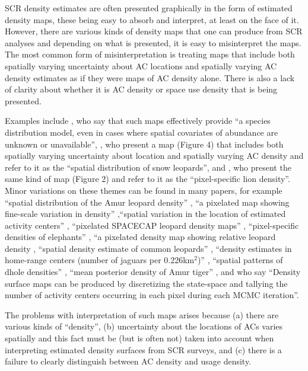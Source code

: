 \documentclass[useAMS,usenatbib,referee]{biom}
\begin{document}
SCR density estimates are often presented graphically in the form of estimated density maps, these being easy to absorb and interpret, at least on the face of it.  However, there are various kinds of density maps that one can produce from SCR analyses and depending on what is presented, it is easy to misinterpret the maps. The most common form of misinterpretation is treating maps that include both spatially varying uncertainty about AC locations and spatially varying AC density estimates as if they were maps of AC density alone. There is also a lack of clarity about whether it is AC density or space use density that is being presented.

Examples include \cite{Dorazio+Karanth:17}, who say that such maps effectively provide  ``a species distribution model, even in cases where spatial covariates of abundance are unknown or unavailable'', \cite{Alexander+al:15}, who present a map (Figure 4) that includes both spatially varying uncertainty about location and spatially varying AC density and refer to it as the ``spatial distribution of snow leopards'', and \cite{Elliot+Gopalaswamy:16}, who present the same kind of map (Figure 2) and refer to it as the ``pixel-specific lion density''. Minor variations on these themes can be found in many papers, for example ``spatial distribution of the Amur leopard density'' \citep{Qi2015}, ``a pixelated map showing fine-scale variation in density'' \citep{Fouche2020},``spatial variation in the location of estimated activity centers'' \citep{Blanc2013}, ``pixelated SPACECAP leopard density maps'' \citep{Devens2021}, ``pixel-specific densities of elephants'' \citep{Goswami2019}, ``a pixelated density map showing relative leopard density \citep{Kandel2020}, ``spatial density estimate of common leopards'' \citep{Goldberg2015}, ``density estimates in home-range centers (number of jaguars per 0.226km$^2$)'' \citep{Lavariega2020}, ``spatial patterns of dhole densities'' \citep{Srivathsa2021}, ``mean posterior density of Amur tiger'' \citep{Xiao2016}, and \cite{Chandler+Royle:13} who say ``Density surface maps can be produced by discretizing the state-space and tallying the number of activity centers occurring in each pixel during each MCMC iteration''.

The problems with interpretation of such maps arises because (a) there are various kinds of ``density'', (b) uncertainty about the locations of ACs varies spatially and this fact must be (but is often not) taken into account when interpreting estimated density surfaces from SCR surveys, and (c) there is a failure to clearly distinguish between AC density and usage density. 
\end{document}
